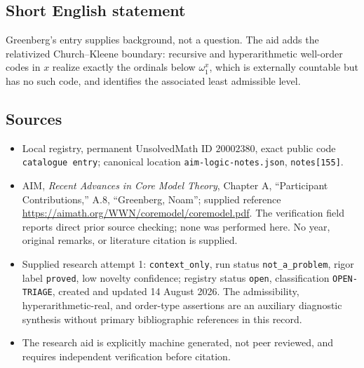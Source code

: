 \documentclass[11pt]{article}
\begin{document}
\subsection{Short English statement}
Greenberg's entry supplies background, not a question. The aid adds the relativized Church--Kleene boundary: recursive and hyperarithmetic well-order codes in \(x\) realize exactly the ordinals below \(\omega_1^x\), which is externally countable but has no such code, and identifies the associated least admissible level.
\subsection{Sources}
\begin{itemize}
\item Local registry, permanent UnsolvedMath ID \(20002380\), exact public code \texttt{catalogue entry}; canonical location \texttt{aim-logic-notes.json}, \texttt{notes[155]}.
\item AIM, \emph{Recent Advances in Core Model Theory}, Chapter A, ``Participant Contributions,'' A.8, ``Greenberg, Noam''; supplied reference \url{https://aimath.org/WWN/coremodel/coremodel.pdf}. The verification field reports direct prior source checking; none was performed here. No year, original remarks, or literature citation is supplied.
\item Supplied research attempt 1: \texttt{context\_only}, run status \texttt{not\_a\_problem}, rigor label \texttt{proved}, low novelty confidence; registry status \texttt{open}, classification \texttt{OPEN-TRIAGE}, created and updated 14 August 2026. The admissibility, hyperarithmetic-real, and order-type assertions are an auxiliary diagnostic synthesis without primary bibliographic references in this record.
\item The research aid is explicitly machine generated, not peer reviewed, and requires independent verification before citation.
\end{itemize}
\end{document}
